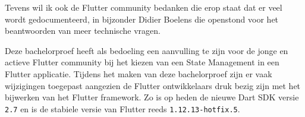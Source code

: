 Tevens wil ik ook de Flutter community bedanken die erop staat dat er veel wordt gedocumenteerd, in bijzonder Didier Boelens die openstond voor het beantwoorden van meer technische vragen.

Deze bachelorproef heeft als bedoeling een aanvulling te zijn voor de jonge en actieve Flutter community bij het kiezen van een State Management in een Flutter applicatie. Tijdens het maken van deze bachelorproef zijn er vaak wijzigingen toegepast aangezien de Flutter ontwikkelaars druk bezig zijn met het bijwerken van het Flutter framework. Zo is op heden de nieuwe Dart SDK versie \verb|2.7| en is de stabiele versie van Flutter reeds \verb|1.12.13-hotfix.5|.